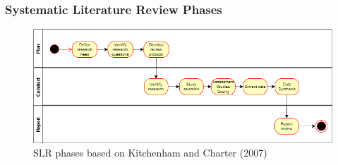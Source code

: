 \documentclass[10pt]{beamer}
\begin{document}
\begin{frame}
	\frametitle{Systematic Literature Review Phases}
	\begin{figure}
		\includegraphics[scale=0.5]{../img/slr_phases.png}
		\caption{SLR phases based on Kitchenham and Charter (2007)}
		\label{figure2}
	\end{figure}
\end{frame}
\end{document}
